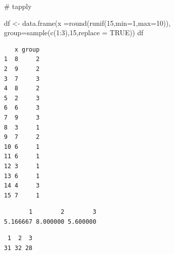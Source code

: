 \documentclass[
  letterpaper,
  DIV=11,
  numbers=noendperiod]{scrreprt}
\newenvironment{Shaded}{\begin{snugshade}}{\end{snugshade}}
\newcommand{\AttributeTok}[1]{\textcolor[rgb]{0.40,0.45,0.13}{#1}}
\newcommand{\CommentTok}[1]{\textcolor[rgb]{0.37,0.37,0.37}{#1}}
\newcommand{\ConstantTok}[1]{\textcolor[rgb]{0.56,0.35,0.01}{#1}}
\newcommand{\DecValTok}[1]{\textcolor[rgb]{0.68,0.00,0.00}{#1}}
\newcommand{\FunctionTok}[1]{\textcolor[rgb]{0.28,0.35,0.67}{#1}}
\newcommand{\NormalTok}[1]{\textcolor[rgb]{0.00,0.23,0.31}{#1}}
\newcommand{\OtherTok}[1]{\textcolor[rgb]{0.00,0.23,0.31}{#1}}
\newcommand{\SpecialCharTok}[1]{\textcolor[rgb]{0.37,0.37,0.37}{#1}}
\begin{document}
\begin{Shaded}
\begin{Highlighting}[]
\CommentTok{\# tapply}

\NormalTok{df }\OtherTok{\textless{}{-}} \FunctionTok{data.frame}\NormalTok{(}\AttributeTok{x =}\FunctionTok{round}\NormalTok{(}\FunctionTok{runif}\NormalTok{(}\DecValTok{15}\NormalTok{,}\AttributeTok{min=}\DecValTok{1}\NormalTok{,}\AttributeTok{max=}\DecValTok{10}\NormalTok{)),}
                 \AttributeTok{group=}\FunctionTok{sample}\NormalTok{(}\FunctionTok{c}\NormalTok{(}\DecValTok{1}\SpecialCharTok{:}\DecValTok{3}\NormalTok{),}\DecValTok{15}\NormalTok{,}\AttributeTok{replace =} \ConstantTok{TRUE}\NormalTok{))}
\NormalTok{df}
\end{Highlighting}
\end{Shaded}

\begin{verbatim}
   x group
1  8     2
2  9     2
3  7     3
4  8     2
5  2     3
6  6     3
7  9     3
8  3     1
9  7     2
10 6     1
11 6     1
12 3     1
13 6     1
14 4     3
15 7     1
\end{verbatim}

\begin{Shaded}
\end{Shaded}

\begin{verbatim}
       1        2        3 
5.166667 8.000000 5.600000 
\end{verbatim}

\begin{Shaded}
\end{Shaded}

\begin{verbatim}
 1  2  3 
31 32 28 
\end{verbatim}

\begin{Shaded}
\end{Shaded}
\end{document}
